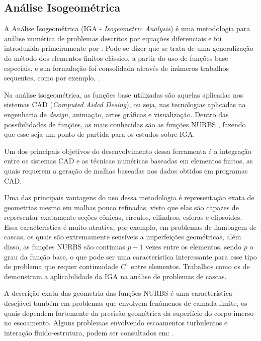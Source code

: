 \documentclass[tese_patricia.tex]{subfiles}
\begin{document}
\subsection{Análise Isogeométrica}
\label{igasection}

A Análise Isogeométrica (IGA - \textit{Isogeometric Analysis}) é uma metodologia para análise numérica de problemas descritos por equações diferenciais e foi introduzida primeiramente por . Pode-se dizer que se trata de uma generalização do método dos elementos finitos clássico, a partir do uso de funções base especiais, e sua formulação foi consolidada através de inúmeros trabalhos sequentes, como por exemplo, .

Na análise isogeométrica, as funções base utilizadas são aquelas aplicadas nos sistemas CAD (\textit{Computed Aided Desing}), ou seja, nas tecnologias aplicadas na engenharia de \textit{design}, animação, artes gráficas e visualização.  Dentro das possibilidades de funções, as mais conhecidas são as funções NURBS \cite{PiegT:1996}, fazendo que esse seja um ponto de partida para os estudos sobre IGA.

Um dos principais objetivos do desenvolvimento dessa ferramenta é a integração entre os sistemas CAD e as técnicas numéricas baseadas em elementos finitos, as quais requerem a geração de malhas baseadas nos dados obtidos em programas CAD. 

Uma das principais vantagens do uso dessa metodologia é representação exata de geometrias mesmo em malhas pouco refinadas, visto que elas são capazes de representar exatamente seções cônicas, círculos, cilindros, esferas e elipsoides. Essa característica é muito atrativa, por exemplo, em problemas de flambagem de cascas, os quais são extremamente sensíveis a imperfeições geométricas, além disso, as funções NURBS são continuas $p-1$ vezes entre os elementos, sendo $p$ o grau da função base, o que pode ser uma característica interessante para esse tipo de problema que requer continuidade $C^1$ entre elementos. Trabalhos como os de  demonstram a aplicabilidade da IGA na análise de problemas de cascas.

A descrição exata das geometria das funções NURBS é uma característica desejável também em problemas que envolvem fenômenos de camada limite, os quais dependem fortemente da precisão geométrica da superfície do corpo imerso no escoamento. Alguns problemas envolvendo escoamentos turbulentos e interação fluido-estrutura, podem ser consultados em: .
\end{document}

